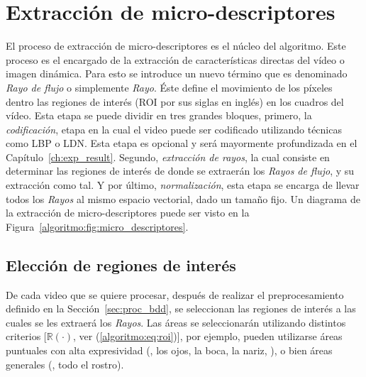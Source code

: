 \section{Extracción de micro-descriptores}
\label{sec:micro_descriptores}
	El proceso de extracción de micro-descriptores es el núcleo del algoritmo. Este proceso es el encargado de la extracción de características directas del vídeo o imagen dinámica. Para esto se introduce un nuevo término que es denominado \textit{Rayo de flujo} o simplemente \textit{Rayo}. Éste define el movimiento de los píxeles dentro las regiones de interés (ROI por sus siglas en inglés) en los cuadros del vídeo. Esta etapa se puede dividir en tres grandes bloques, primero, la \emph{codificación}, etapa en la cual el video puede ser codificado utilizando técnicas como LBP o LDN\@. Esta etapa es opcional y será mayormente profundizada en el Capítulo~\ref{ch:exp_result}. Segundo, \emph{extracción de rayos}, la cual consiste en determinar las regiones de interés de donde se extraerán los \textit{Rayos de flujo}, y su extracción como tal. Y por último, \emph{normalización}, esta etapa se encarga de llevar todos los \textit{Rayos} al mismo espacio vectorial, dado un tamaño fijo. Un diagrama de la extracción de micro-descriptores puede ser visto en la Figura~\ref{algoritmo:fig:micro_descriptores}.


	\subsection{Elección de regiones de interés}
	\label{algoritmo:elecc_roi}
	De cada video que se quiere procesar, después de realizar el preprocesamiento definido en la Sección~\ref{sec:proc_bdd}, se seleccionan las regiones de interés a las cuales se les extraerá los \textit{Rayos}. Las áreas se seleccionarán utilizando distintos criterios [$\mathds{R}(\cdot)$, ver (\ref{algoritmo:eq:roi})], por ejemplo, pueden utilizarse áreas puntuales con alta expresividad (\eg, los ojos, la boca, la nariz, \etc), o bien áreas generales (\eg, todo el rostro).
	
